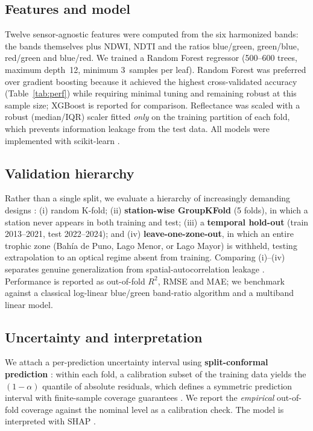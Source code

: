 \documentclass[11pt]{article}
\begin{document}
\subsection{Features and model}
Twelve sensor-agnostic features were computed from the six harmonized bands: the
bands themselves plus NDWI, NDTI and the ratios blue/green, green/blue, red/green
and blue/red. We trained a Random Forest regressor \citep{Breiman2001} (500--600
trees, maximum depth~12, minimum 3~samples per leaf). Random Forest was preferred
over gradient boosting because it achieved the highest cross-validated accuracy
(Table~\ref{tab:perf}) while requiring minimal tuning and remaining robust at this
sample size; XGBoost \citep{Chen2016} is reported for comparison. Reflectance was
scaled with a robust (median/IQR) scaler fitted \emph{only} on the training
partition of each fold, which prevents information leakage from the test data.
All models were implemented with scikit-learn \citep{Pedregosa2011}.

\subsection{Validation hierarchy}
Rather than a single split, we evaluate a hierarchy of increasingly demanding
designs \citep{Roberts2017}: (i) random K-fold; (ii) \textbf{station-wise
GroupKFold} (5 folds), in which a station never appears in both training and test;
(iii) a \textbf{temporal hold-out} (train 2013--2021, test 2022--2024); and
(iv) \textbf{leave-one-zone-out}, in which an entire trophic zone (Bah\'ia de Puno,
Lago Menor, or Lago Mayor) is withheld, testing extrapolation to an optical regime
absent from training. Comparing (i)--(iv) separates genuine generalization from
spatial-autocorrelation leakage \citep{Ploton2020,Meyer2019}. Performance is reported as
out-of-fold $R^2$, RMSE and MAE; we benchmark against a classical log-linear
blue/green band-ratio algorithm and a multiband linear model.

\subsection{Uncertainty and interpretation}
We attach a per-prediction uncertainty interval using \textbf{split-conformal
prediction} \citep{Angelopoulos2023}: within each fold, a calibration subset of the
training data yields the $(1-\alpha)$ quantile of absolute residuals, which defines
a symmetric prediction interval with finite-sample coverage guarantees
\citep{Romano2019}. We report the \emph{empirical} out-of-fold coverage against the
nominal level as a calibration check. The model is interpreted with SHAP \citep{Lundberg2017,Lundberg2020}.
\end{document}

